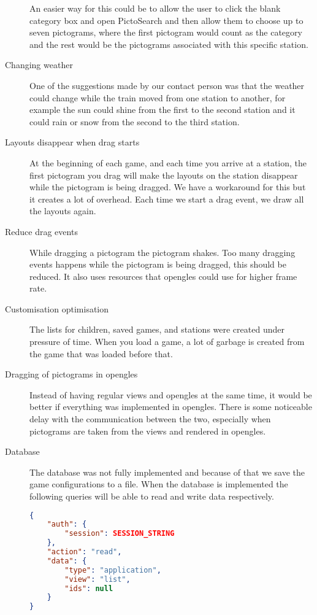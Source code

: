 \begin{description}
An easier way for this could be to allow the user to click the blank category box and open PictoSearch and then allow them to choose up to seven pictograms, where the first pictogram would count as the category and the rest would be the pictograms associated with this specific station.
\item[Changing weather] One of the suggestions made by our contact person was that the weather could change while the train moved from one station to another, for example the sun could shine from the first to the second station and it could rain or snow from the second to the third station. 
\item[Layouts disappear when drag starts] At the beginning of each game, and each time you arrive at a station, the first pictogram you drag will make the layouts on the station disappear while the pictogram is being dragged. We have a workaround for this but it creates a lot of overhead. Each time we start a drag event, we draw all the layouts again.
\item[Reduce drag events] While dragging a pictogram the pictogram shakes. Too many dragging events happens while the pictogram is being dragged, this should be reduced. It also uses resources that \ac{opengles} could use for higher frame rate.
\item[Customisation optimisation] The lists for children, saved games, and stations were created under pressure of time. When you load a game, a lot of garbage is created from the game that was loaded before that.
\item[Dragging of pictograms in \ac{opengles}] Instead of having regular views and \ac{opengles} at the same time, it would be better if everything was implemented in \ac{opengles}. There is some noticeable delay with the communication between the two, especially when pictograms are taken from the views and rendered in \ac{opengles}.
\item[Database] The database was not fully implemented and because of that we save the game configurations to a file. When the database is implemented the following queries will be able to read and write data respectively.
\begin{lstlisting}[language=json,firstnumber=1,caption={JSON query to read application data.},label=lst:jsonread]
{
    "auth": {
        "session": SESSION_STRING
    },
    "action": "read",
    "data": {
        "type": "application",
        "view": "list",
        "ids": null
    }
}
\end{lstlisting}


\end{description}
